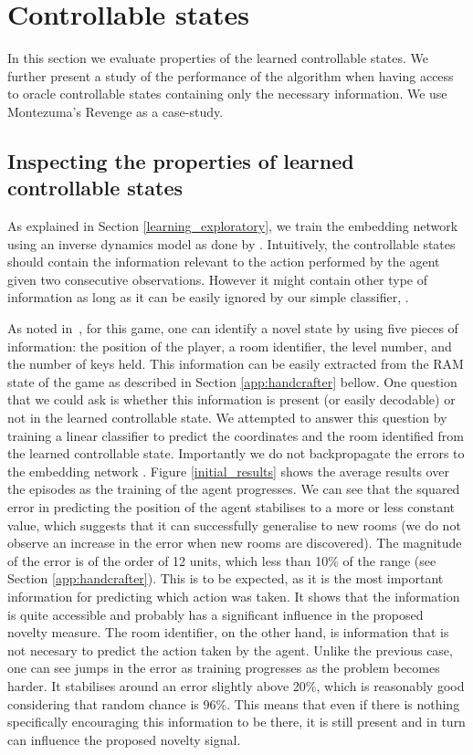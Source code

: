 \documentclass{article} \usepackage{iclr2020_conference,times}
\begin{document}
\section{Controllable states}
\label{app:controllable_states}

In this section we evaluate properties of the learned controllable states. We further present a study of the performance of the algorithm when having access to oracle controllable states containing only the necessary information. We use Montezuma's Revenge as a case-study. 

\subsection{Inspecting the properties of learned controllable states}
As explained in Section \ref{learning_exploratory}, we train the embedding network  using an inverse dynamics model as done by \cite{pathak2017curiosity}. Intuitively, the controllable states should contain the information relevant to the action performed by
the agent given two consecutive observations. However it might contain other type of information as long as it can be easily ignored by our simple classifier, .


As noted in~\cite{burda2018exploration}, for this game, one can identify a novel state by using five pieces of information: the  position of the player, a room identifier, the level number, and the number of keys held. This information can be easily extracted from the RAM state of the game as described in Section \ref{app:handcrafter} bellow. 
One question that we could ask is whether this information is present (or easily decodable) or not in the learned controllable state.
We attempted to answer this question by training a linear classifier to predict the  coordinates and the room identified from the learned controllable state. Importantly we do not backpropagate the errors to the embedding network . Figure \ref{initial_results} shows the average results over the episodes as the training of the agent progresses. We can see that the squared error in predicting the  position of the agent stabilises to a more or less constant value, which suggests that it can successfully generalise to new rooms (we do not observe an increase in the error when new rooms are discovered). The magnitude of the error is of the order of 12 units, which less than 10\% of the range (see Section \ref{app:handcrafter}). This is to be expected, as it is the most important information for predicting which action was taken. It shows that the information is quite accessible and probably has a significant influence in the proposed novelty measure.
The room identifier, on the other hand, is information that is not necesary to predict the action taken by the agent. Unlike the previous case, one can see jumps in the error as training progresses as the problem becomes harder. It stabilises around an error slightly above 20\%, which is reasonably good considering that random chance is 96\%. This means that even if there is nothing specifically encouraging this information to be there, it is still present and in turn can influence the proposed novelty signal.
\end{document}
